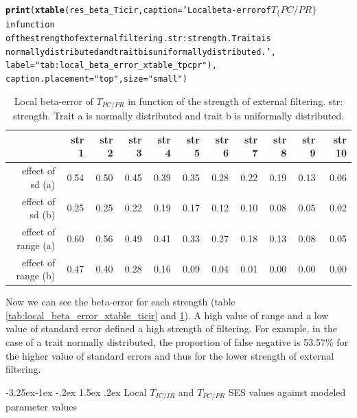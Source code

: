 \documentclass[12pt]{article}\usepackage[]{graphicx}\usepackage[]{color}
\makeatletter
\newcommand{\hlstr}[1]{\textcolor[rgb]{0.192,0.494,0.8}{#1}}%
\newcommand{\hlstd}[1]{\textcolor[rgb]{0.345,0.345,0.345}{#1}}%
\newcommand{\hlkwc}[1]{\textcolor[rgb]{0.333,0.667,0.333}{#1}}%
\newcommand{\hlkwd}[1]{\textcolor[rgb]{0.737,0.353,0.396}{\textbf{#1}}}%
\newenvironment{kframe}{%
 \def\at@end@of@kframe{}%
 \ifinner\ifhmode%
  \def\at@end@of@kframe{\end{minipage}}%
  \begin{minipage}{\columnwidth}%
 \fi\fi%
 \def\FrameCommand##1{\hskip\@totalleftmargin \hskip-\fboxsep
 \colorbox{shadecolor}{##1}\hskip-\fboxsep
     \hskip-\linewidth \hskip-\@totalleftmargin \hskip\columnwidth}%
 \MakeFramed {\advance\hsize-\width
   \@totalleftmargin\z@ \linewidth\hsize
   \@setminipage}}%
 {\par\unskip\endMakeFramed%
 \at@end@of@kframe}
\newcounter {subsubsubsection}[subsubsection]
\newcommand\subsubsubsection{\@startsection{subsubsubsection}{4}{\z@}%
          {-3.25ex\@plus -1ex \@minus -.2ex}%
          {1.5ex \@plus .2ex}%
          {\normalfont\normalsize\bfseries}}
\makeatother
\begin{document}
\begin{kframe}
\begin{alltt}
\hlkwd{print}\hlstd{(}\hlkwd{xtable}\hlstd{(res_beta_Ticir,} \hlkwc{caption} \hlstd{=} \hlstr{'Local beta-error of $T_\{PC/PR\}$ in function 
             of the strength of external filtering. str: strength. Trait a is 
             normally distributed and trait b is uniformally distributed.'}\hlstd{,}
             \hlkwc{label} \hlstd{=} \hlstr{"tab:local_beta_error_xtable_tpcpr"}\hlstd{),}
      \hlkwc{caption.placement} \hlstd{=} \hlstr{"top"}\hlstd{,} \hlkwc{size} \hlstd{=} \hlstr{"small"}\hlstd{)}
\end{alltt}
\end{kframe}%
\begin{table}[ht]
\centering
\caption{Local beta-error of $T_{PC/PR}$ in function 
             of the strength of external filtering. str: strength. Trait a is 
             normally distributed and trait b is uniformally distributed.} 
\label{tab:local_beta_error_xtable_tpcpr}
{\small
\begin{tabular}{rrrrrrrrrrr}
  \hline
 & str 1 & str 2 & str 3 & str 4 & str 5 & str 6 & str 7 & str 8 & str 9 & str 10 \\ 
  \hline
effect of sd (a) & 0.54 & 0.50 & 0.45 & 0.39 & 0.35 & 0.28 & 0.22 & 0.19 & 0.13 & 0.06 \\ 
  effect of sd (b) & 0.25 & 0.25 & 0.22 & 0.19 & 0.17 & 0.12 & 0.10 & 0.08 & 0.05 & 0.02 \\ 
  effect of range (a) & 0.60 & 0.56 & 0.49 & 0.41 & 0.33 & 0.27 & 0.18 & 0.13 & 0.08 & 0.05 \\ 
  effect of range (b) & 0.47 & 0.40 & 0.28 & 0.16 & 0.09 & 0.04 & 0.01 & 0.00 & 0.00 & 0.00 \\ 
   \hline
\end{tabular}
}
\end{table}

 
Now we can see the beta-error for each strength (table \ref{tab:local_beta_error_xtable_ticir} and \ref{tab:local_beta_error_xtable_tpcpr}). A high value of range and a low value of standard error defined a high strength of filtering. For example, in the case of a trait normally distributed, the proportion of false negative is 53.57\% for the higher value of standard errors and thus for the lower strength of external filtering.
 
 
  \subsubsubsection {Local $T_{IC/IR}$ and $T_{PC/PR}$ SES values against modeled parameter values}
  
\end{document}
